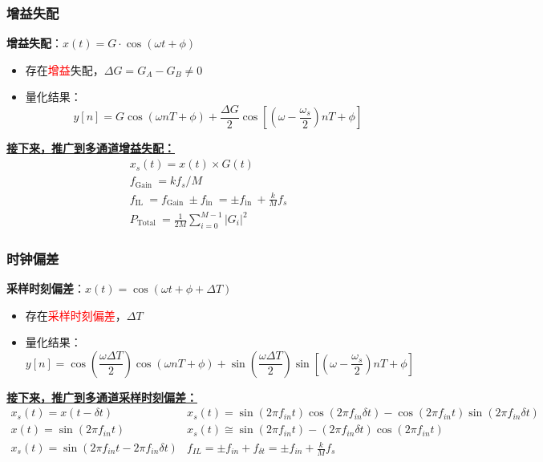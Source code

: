 \documentclass[cs4size,a4paper]{ctexart}
\numberwithin{equation}{section}
\numberwithin{table}{section}
\numberwithin{figure}{section}
\begin{document}
		
		
		\subsubsection{增益失配}
		\textbf{增益失配}：$x(t) = G \cdot \cos(\omega t + \phi)$
		\begin{itemize}
			\item 存在\textcolor{red}{增益}失配，$\Delta G = G_A - G_B \neq 0$
			\item 量化结果：
			\[
			y[n] = G \cos(\omega nT + \phi) + \frac{\Delta G}{2} \cos\left[ \left(\omega - \frac{\omega_s}{2} \right) nT + \phi \right]
			\]
		\end{itemize}
		\underline{\textbf{接下来，推广到多通道增益失配：}}
		\begin{equation}
			\begin{gathered}
				x_s(t)=x(t) \times G(t) \\
				 f_{\text {Gain }} =k f_s / M \\
				f_{\text {IL }}=f_{\text {Gain }} \pm f_{\text {in }}= \pm f_{\text {in }}+\frac{k}{M} f_s \\
				 P_{\text {Total }}  =\frac{1}{2 M} \sum_{i=0}^{M-1}\left|G_i\right|^2
			\end{gathered}
		\end{equation}
		
		\subsubsection{时钟偏差}
		\textbf{采样时刻偏差}：$x(t) = \cos(\omega t + \phi + \Delta T)$
		\begin{itemize}
			\item 存在\textcolor{red}{采样时刻偏差}，$\Delta T$
			\item 量化结果：
			\[
			y[n] = \cos\left(\frac{\omega \Delta T}{2}\right) \cos(\omega nT + \phi) + \sin\left(\frac{\omega \Delta T}{2}\right) \sin\left[\left(\omega - \frac{\omega_s}{2} \right) nT + \phi \right]
			\]
		\end{itemize}
		\underline{\textbf{接下来，推广到多通道采样时刻偏差：}}
		\begin{equation}
			\begin{array}{lr}
				x_s(t)=x(t-\delta t) & x_s(t)=\sin \left(2 \pi f_{i n} t\right) \cos \left(2 \pi f_{i n} \delta t\right)-\cos \left(2 \pi f_{i n} t\right) \sin \left(2 \pi f_{i n} \delta t\right) \\
				x(t)=\sin \left(2 \pi f_{i n} t\right) & x_s(t) \cong \sin \left(2 \pi f_{i n} t\right)-\left(2 \pi f_{i n} \delta t\right) \cos \left(2 \pi f_{i n} t\right) \\
				x_s(t)=\sin \left(2 \pi f_{i n} t-2 \pi f_{i n} \delta t \right) & f_{I L}= \pm f_{i n}+f_{\delta t}= \pm f_{i n}+\frac{k}{M} f_s \nonumber
			\end{array}
		\end{equation}
		
\end{document}
